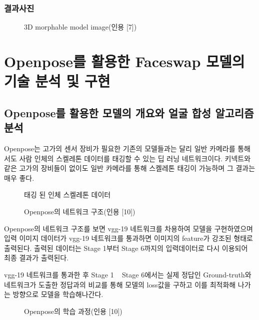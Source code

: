 \documentclass{oblivoir}
\begin{document}
\subsection{ 결과사진 }

\begin{figure}[h!]
    \centering
\caption{ 3D morphable model image(인용 [7])}
\end{figure}



\chapter{Openpose를 활용한 Faceswap 모델의 기술 분석 및 구현}

\section{Openpose를 활용한 모델의 개요와 얼굴 합성 알고리즘 분석}

Openpose는 고가의 센서 장비가 필요한 기존의 모델들과는 달리 일반 카메라를 통해서도 사람 인체의 스켈레톤 데이터를 태깅할 수 있는 딥 러닝 네트워크이다. 키넥트와 같은 고가의 장비들이 없이도 일반 카메라를 통해 스켈레톤 태깅이 가능하며 그 결과는 매우 좋다.

\begin{figure}[h!]
    \centering
\caption{태깅 된 인체 스켈레톤 데이터}
\end{figure}

\begin{figure}[h!]
    \centering
\caption{Openpose의 네트워크 구조(인용 [10])}
\end{figure}


Openpose의 네트워크 구조를 보면 vgg-19 네트워크를 차용하여 모델을 구현하였으며 입력 이미지 데이터가 vgg-19 네트워크를 통과하면 이미지의 feature가 강조된 형태로 출력된다. 출력된 데이터는 Stage 1부터 Stage 6까지의 입력데이터로 다시 이용되어 최종 결과가 출력된다.

vgg-19 네트워크를 통과한 후 Stage 1 ~ Stage 6에서는 실제 정답인 Ground-truth와 네트워크가 도출한 정답과의 비교를 통해 모델의 loss값을 구하고 이를 최적화해 나가는 방향으로 모델을 학습해나간다.

\begin{figure}[h!]
    \centering
\caption{Openpose의 학습 과정(인용 [10])}
\end{figure}
\end{document}
